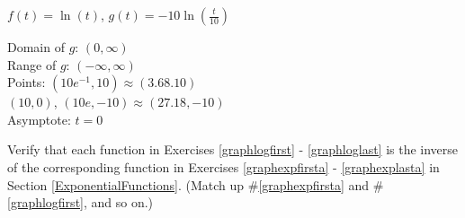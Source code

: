 \documentclass{ximera}
\begin{document}
\begin{question}
\begin{problem}\label{graphloglast}
$f(t) = \ln(t)$, $g(t) = -10\ln\left(\frac{t}{10}\right)$ 

\begin{solution}
     Domain of $g$:  $(0, \infty)$\\
 Range of $g$:  $(-\infty, \infty)$\\
 Points:  $(10e^{-1}, 10) \approx (3.68. 10)$ \\
 $(10,0)$, $(10e, -10) \approx (27.18, -10)$ \\
 Asymptote: $t = 0$ \\
\end{solution}
\end{problem}

\end{question}

\begin{problem}
Verify that each function in Exercises \ref{graphlogfirst} - \ref{graphloglast} is the inverse of the corresponding function in Exercises \ref{graphexpfirsta} - \ref{graphexplasta} in Section \ref{ExponentialFunctions}.  (Match up \#\ref{graphexpfirsta} and \#\ref{graphlogfirst}, and so on.)    
\end{problem}
  
\end{document}
